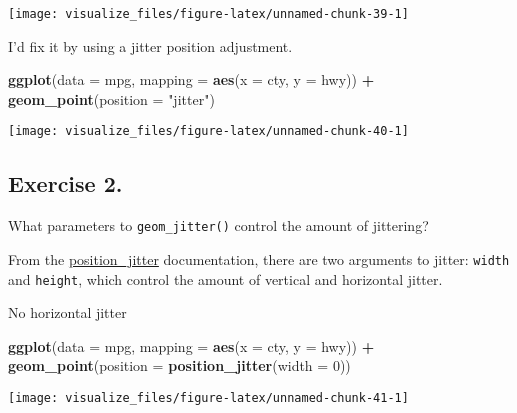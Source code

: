 \documentclass[]{book}
\newenvironment{Shaded}{\begin{snugshade}}{\end{snugshade}}
\newcommand{\DataTypeTok}[1]{\textcolor[rgb]{0.13,0.29,0.53}{#1}}
\newcommand{\DecValTok}[1]{\textcolor[rgb]{0.00,0.00,0.81}{#1}}
\newcommand{\KeywordTok}[1]{\textcolor[rgb]{0.13,0.29,0.53}{\textbf{#1}}}
\newcommand{\NormalTok}[1]{#1}
\newcommand{\OperatorTok}[1]{\textcolor[rgb]{0.81,0.36,0.00}{\textbf{#1}}}
\newcommand{\StringTok}[1]{\textcolor[rgb]{0.31,0.60,0.02}{#1}}
\theoremstyle{plain}
\theoremstyle{remark}
\theoremstyle{definition}
\theoremstyle{definition}
\theoremstyle{definition}
\theoremstyle{remark}
\begin{document}
\begin{center}\texttt{[image: visualize\_files/figure-latex/unnamed-chunk-39-1]} \end{center}

I'd fix it by using a jitter position adjustment.

\begin{Shaded}
\begin{Highlighting}[]
\KeywordTok{ggplot}\NormalTok{(}\DataTypeTok{data =}\NormalTok{ mpg, }\DataTypeTok{mapping =} \KeywordTok{aes}\NormalTok{(}\DataTypeTok{x =}\NormalTok{ cty, }\DataTypeTok{y =}\NormalTok{ hwy)) }\OperatorTok{+}
\StringTok{  }\KeywordTok{geom_point}\NormalTok{(}\DataTypeTok{position =} \StringTok{"jitter"}\NormalTok{)}
\end{Highlighting}
\end{Shaded}

\begin{center}\texttt{[image: visualize\_files/figure-latex/unnamed-chunk-40-1]} \end{center}

\hypertarget{exercise-2.-2}{%
\subsection{Exercise 2.}\label{exercise-2.-2}}

What parameters to \texttt{geom\_jitter()} control the amount of
jittering?

From the
\href{http://docs.ggplot2.org/current/position_jitter.html}{position\_jitter}
documentation, there are two arguments to jitter: \texttt{width} and
\texttt{height}, which control the amount of vertical and horizontal
jitter.

No horizontal jitter

\begin{Shaded}
\begin{Highlighting}[]
\KeywordTok{ggplot}\NormalTok{(}\DataTypeTok{data =}\NormalTok{ mpg, }\DataTypeTok{mapping =} \KeywordTok{aes}\NormalTok{(}\DataTypeTok{x =}\NormalTok{ cty, }\DataTypeTok{y =}\NormalTok{ hwy)) }\OperatorTok{+}
\StringTok{  }\KeywordTok{geom_point}\NormalTok{(}\DataTypeTok{position =} \KeywordTok{position_jitter}\NormalTok{(}\DataTypeTok{width =} \DecValTok{0}\NormalTok{))}
\end{Highlighting}
\end{Shaded}

\begin{center}\texttt{[image: visualize\_files/figure-latex/unnamed-chunk-41-1]} \end{center}
\end{document}
